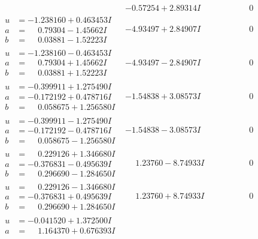 \documentclass[1p]{elsarticle_modified}
\theoremstyle{definition}
\begin{document}
$$\begin{array}{c|c|c}
 & -0.57254 + 2.89314 I & \phantom{-0.000000 } 0 \\ \hline\begin{aligned}
u &= -1.238160 + 0.463453 I \\
a &= \phantom{-}0.79304 - 1.45662 I \\
b &= \phantom{-}0.03881 - 1.52223 I\end{aligned}
 & -4.93497 + 2.84907 I & \phantom{-0.000000 } 0 \\ \hline\begin{aligned}
u &= -1.238160 - 0.463453 I \\
a &= \phantom{-}0.79304 + 1.45662 I \\
b &= \phantom{-}0.03881 + 1.52223 I\end{aligned}
 & -4.93497 - 2.84907 I & \phantom{-0.000000 } 0 \\ \hline\begin{aligned}
u &= -0.399911 + 1.275490 I \\
a &= -0.172192 + 0.478716 I \\
b &= \phantom{-}0.058675 + 1.256580 I\end{aligned}
 & -1.54838 + 3.08573 I & \phantom{-0.000000 } 0 \\ \hline\begin{aligned}
u &= -0.399911 - 1.275490 I \\
a &= -0.172192 - 0.478716 I \\
b &= \phantom{-}0.058675 - 1.256580 I\end{aligned}
 & -1.54838 - 3.08573 I & \phantom{-0.000000 } 0 \\ \hline\begin{aligned}
u &= \phantom{-}0.229126 + 1.346680 I \\
a &= -0.376831 - 0.495639 I \\
b &= \phantom{-}0.296690 - 1.284650 I\end{aligned}
 & \phantom{-}1.23760 - 8.74933 I & \phantom{-0.000000 } 0 \\ \hline\begin{aligned}
u &= \phantom{-}0.229126 - 1.346680 I \\
a &= -0.376831 + 0.495639 I \\
b &= \phantom{-}0.296690 + 1.284650 I\end{aligned}
 & \phantom{-}1.23760 + 8.74933 I & \phantom{-0.000000 } 0 \\ \hline\begin{aligned}
u &= -0.041520 + 1.372500 I \\
a &= \phantom{-}1.164370 + 0.676393 I \\

\end{aligned}
\end{array}$$
\end{document}

